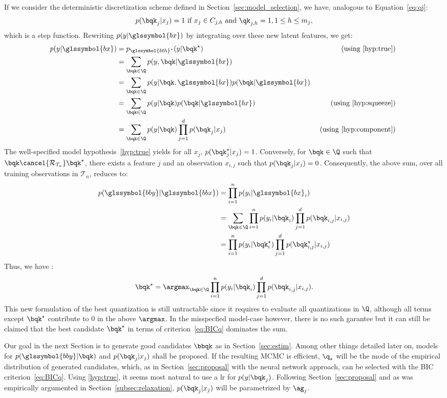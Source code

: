 If we consider the deterministic discretization scheme defined in Section~\ref{sec:model_selection}, we have, analogous to Equation~\eqref{eq:qj}:
$$
p(\bqk_j | x_j) = 1 \text{ if } x_j \in C_{j,h} \text{ and } \qk_{j,h} = 1, 1 \leq h \leq m_j,
$$
which is a step function. Rewriting $p(y| \glssymbol{bx})$ by integrating over these new latent features,
we get:
\begin{align*}
p(y | \glssymbol{bx}) & = p_{\glssymbol{bth}^\star}(y | \bqk^\star) & \text{ (using \eqref{hyp:true}) } \\
& = \sum_{\bqk \in \Q} p(y, \bqk | \glssymbol{bx}) \\
& = \sum_{\bqk \in \Q} p(y | \bqk, \glssymbol{bx}) p(\bqk | \glssymbol{bx}) \\
& = \sum_{\bqk \in \Q} p(y | \bqk) p(\bqk | \glssymbol{bx}) & \text{ (using \eqref{hyp:squeeze}) } \\
& = \sum_{\bqk \in \Q} p(y | \bqk) \prod_{j=1}^d p(\bqk_j | x_j) & \text{ (using \eqref{hyp:component}) }
\end{align*}
The well-specified model hypothesis~\eqref{hyp:true} yields for all $x_j$, $p(\bqk_j^\star | x_j) = 1$. Conversely, for $\bqk \in \Q$ such that $\bqk \cancel{\mathcal{R}_{\mathcal{T}_n}} \bqk^\star$, there exists a feature $j$ and an observation $x_{i,j}$ such that $p(\bqk_j | x_j) = 0$. Consequently, the above sum, over all training observations in $\mathcal{T}_n$, reduces to:
\begin{align*}
p(\glssymbol{bby} | \glssymbol{bbx}) & = \prod_{i=1}^n p(y_i | \glssymbol{bx}_i) \\
 & = \sum_{\bqk \in \Q} \prod_{i=1}^n p(y_i | \bqk_i) \prod_{j=1}^d p(\bqk_{i,j} | x_{i,j}) \\
 & = \prod_{i=1}^n p(y_i | \bqk_i^\star) \prod_{j=1}^d p(\bqk_{i,j}^\star | x_{i,j})
\end{align*}
Thus, we have :
\[ \bqk^\star = \argmax_{\bqk \in \Q} \prod_{i=1}^n p(y_i | \bqk_i ) \prod_{j=1}^d p(\bqk_{i,j} | x_{i,j}). \]
This new formulation of the best quantization is still untractable since it requires to evaluate all quantizations in $\Q$, although all terms except $\bqk^\star$ contribute to $0$ in the above $\argmax$. In the misspecfied model-case however, there is no such garantee but it can still be claimed that the best candidate $\bqk^\star$ in terms of criterion~\eqref{eq:BICq} dominates the sum.

Our goal in the next Section is to generate good candidates $\bbqk$ as in Section~\ref{sec:estim}. Among other things detailed later on, models for $p(\glssymbol{bby} | \bqk)$ and $p(\bqk_j | x_j)$ shall be proposed. If the resulting MCMC is efficient, $\q_\star$ will be the mode of the empirical distribution of generated candidates, which, as in Section~\ref{sec:proposal} with the neural network approach, can be selected with the BIC criterion~\eqref{eq:BICq}. Using \eqref{hyp:true}, it seems most natural to use a \gls{lr} for $p( y | \bqk_j)$. Following Section~\ref{sec:proposal} and as was empirically argumented in Section~\ref{subsec:relaxation}, $p(\bqk_j | x_j)$ will be parametrized by $\ag_j$. 

